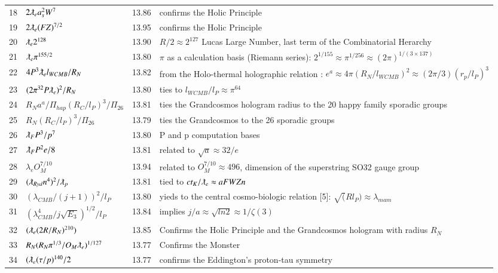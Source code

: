 \documentclass[a4paper,9pt]{article}
\begin{document}
\begin{appendix}
\begin{table}
\begin{tabular}{llll}
    18 & $2\lambdabar_{e} a_s^2 W^7$ & 13.86 & confirms the Holic Principle \\
    19 & $2\lambdabar_{e} (FZ)^{7/2}$ & 13.95 & confirms the Holic Principle \\
    20 & $\lambdabar_{e} 2^{128}$ & 13.90 & $R/2 \approx 2^{127}$ Lucas Large Number, last term of the Combinatorial Herarchy\\
    21 & $\lambdabar_{e} \pi^{155/2}$ & 13.80 & $\pi$ as a calculation basis (Riemann series): $2^{1/155} \approx \pi^{1/256} \approx (2\pi)^{1/(3\times 137)}$ \\
    22 & $4P^3\lambdabar_{e} l_{WCMB} /R_N$ & 13.82 & from the Holo-thermal holographic relation : $e^a \approx 4\pi (R_N/l_{WCMB} )^2 \approx (2\pi /3) (r_p/l_P)^3$  \\
    23 & $(2\pi^{32}P\lambdabar_{e})^2 /R_N$ & 13.80 & ties to $l_{WCMB}/l_P \approx \pi^{64}$ \\        
    24 & $R_N a^a/\Pi_{hap} (R_{C}/l_P)^3/\Pi_{26}$ & 13.81 & ties the Grandcosmos hologram radius to the 20 happy family sporadic groups \\  
    25 & $R_N (R_{C}/l_P)^3/\Pi_{26}$ & 13.79 & ties the Grandcosmos to the 26 sporadic groups \\   
    26 & $\lambdabar_{F} P^3 /p^7$ & 13.80 & P and p computation bases \\      
    27 & $\lambdabar_{F} P^2 e/8$ & 13.81 &  related to $\sqrt a  \approx 32/e$ \\     
    28 &  $\lambda_{e} O_M^{7/10}$ & 13.94 &  related to $O_M^{7/10} \approx 496$, dimension of the superstring SO32 gauge group  \\
    29 & $(\lambdabar_{Ryd} n^{4})^2/\lambdabar_p$ & 13.81 & tied to $ct_K/\lambdabar_e \approx aFWZn$ \\ 
    30 & $(\lambda_{CMB}/(j+1))^2/l_P$ & 13.80 & yieds to the central cosmo-biologic relation [5]: $\sqrt(Rl_P) \approx \lambda_{mam}$ \\
    31 & $(\lambda_{CMB}^4/j\sqrt{E_3})^{1/2}/l_P$ & 13.84 & implies $j/a \approx \sqrt{ln2} \approx 1/\zeta(3)$\\ 
    32 & $(\lambdabar_{e} (2R/R_N)^{210})$ & 13.85 & Confirms the Holic Principle and the  Grandcosmos hologram with radius $R_N$  \\
    33 & $R_N(R_N \pi^{1/3}/O_M\lambdabar_{e})^{1/127}$ & 13.77 & Confirms the Monster  \\
    34& $(\lambdabar_{e} (\tau /p)^{140}/2$ & 13.77 & confirms the Eddington's proton-tau symmetry \\

\end{tabular}
\end{table}
\end{appendix}
\end{document}
